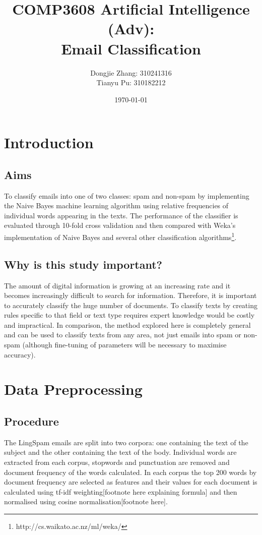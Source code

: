 \documentclass[12pt]{article}
\title{COMP3608 Artificial Intelligence (Adv): \\
Email Classification}
\author{Dongjie Zhang: 310241316 
\\ Tianyu Pu: 310182212}
\date{\today}
\begin{document}
\maketitle

\section{Introduction}
\subsection{Aims}
To classify emails into one of two classes: spam and non-spam by implementing the 
Naive Bayes machine learning algorithm using relative frequencies of individual 
words appearing in the texts. The performance of the classifier is evaluated through 
10-fold cross validation and then compared with Weka's implementation of Naive Bayes 
and several other classification algorithms\footnote{http://cs.waikato.ac.nz/ml/weka/}.

\subsection{Why is this study important?}
The amount of digital information is growing at an increasing rate and it becomes 
increasingly difficult to search for information. Therefore, it is important to 
accurately classify the huge number of documents. To classify texts by creating 
rules specific to that field or text type requires expert knowledge would be costly 
and impractical. In comparison, the method explored here is completely general and 
can be used to classify texts from any area, not just emails into spam or non-spam 
(although fine-tuning of parameters will be necessary to maximise accuracy).

\section{Data Preprocessing}
\subsection{Procedure}
The LingSpam emails are split into two corpora: one containing the text of the 
subject and the other containing the text of the body. Individual words are extracted 
from each corpus, stopwords and punctuation are removed and document frequency of 
the words calculated. In each corpus the top 200 words by document frequency are 
selected as features and their values for each document is calculated using tf-idf 
weighting[footnote here explaining formula] and then normalised using cosine 
normalisation[footnote here].
\end{document}
